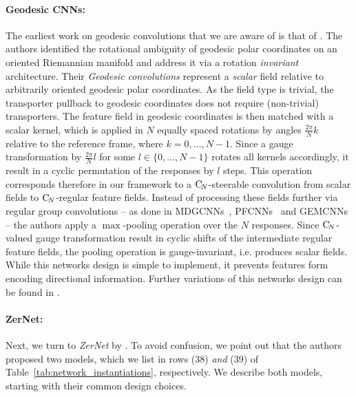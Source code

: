 \paragraph{Geodesic CNNs:}
The earliest work on geodesic convolutions that we are aware of is that of \citet{masci2015geodesic}.
The authors identified the rotational ambiguity of geodesic polar coordinates on an oriented Riemannian manifold and address it via a rotation \emph{invariant} architecture.
Their \emph{Geodesic convolutions} represent a \emph{scalar} field relative to arbitrarily oriented geodesic polar coordinates.
As the field type is trivial, the transporter pullback to geodesic coordinates does not require (non-trivial) transporters.
The feature field in geodesic coordinates is then matched with a scalar kernel, which is applied in $N$ equally spaced rotations by angles $\frac{2\pi}{N}k$ relative to the reference frame, where $k=0,\dots,N-1$.
Since a gauge transformation by $\frac{2\pi}{N}l$ for some $l\in\{0,\dots,N-1\}$ rotates all kernels accordingly, it result in a cyclic permutation of the responses by $l$ steps.
This operation corresponds therefore in our framework to a $\operatorname{C}_{\!N}$-steerable convolution from scalar fields to $\operatorname{C}_{\!N}$-regular feature fields.
Instead of processing these fields further via regular group convolutions
-- as done in MDGCNNs~\cite{poulenard2018multi}, PFCNNs~\cite{Yang2020parallelFrameCNN} and GEMCNNs~\cite{deHaan2020meshCNNs} --
the authors apply a $\max$-pooling operation over the $N$ responses.
Since $\operatorname{C}_{\!N}$-valued gauge transformation result in cyclic shifts of the intermediate regular feature fields, the pooling operation is gauge-invariant, i.e. produces scalar fields.
While this networks design is simple to implement, it prevents features form encoding directional information.
Further variations of this networks design can be found in \cite{masci2015shapenet,monti2017geometric}.







\paragraph{ZerNet:}
Next, we turn to \emph{ZerNet} by \citet{sun2018zernet}.
To avoid confusion, we point out that the authors proposed two models, which we list in rows (38) \emph{and} (39) of Table~\ref{tab:network_instantiations}, respectively.
We describe both models, starting with their common design choices.

